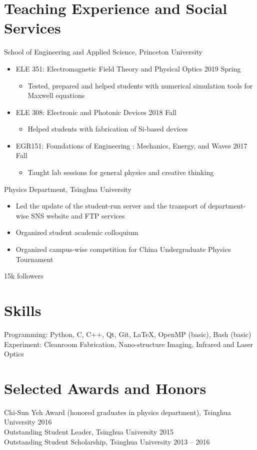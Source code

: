 \documentclass[11pt,letterpaper]{resume}
\begin{document}
\section{Teaching Experience and Social Services}
School of Engineering and Applied Science, Princeton University
\begin{itemize}
    \item ELE 351: Electromagnetic Field Theory and Physical Optics
    \hfill 2019 Spring
    \begin{itemize}
        \item Tested, prepared and helped students with 
        numerical simulation tools for Maxwell equations
    \end{itemize}
    \item ELE 308: Electronic and Photonic Devices
    \hfill 2018 Fall
    \begin{itemize}
        \item Helped students with fabrication of Si-based devices
    \end{itemize}
    \item EGR151: Foundations of Engineering : Mechanics, Energy, and Waves
    \hfill 2017 Fall
    \begin{itemize}
        \item Taught lab sessions for general physics and creative thinking
    \end{itemize}
\end{itemize}\medskip

Physics Department, Tsinghua University
\begin{itemize}
    \item Led the update of the student-run server and 
    the transport of department-wise SNS website and FTP services
    \item Organized student academic colloquium 
    \item Organized campus-wise competition for China Undergraduate Physics 
    Tournament
\end{itemize}\medskip

15k followers

\section{Skills}
Programming: Python, C, C++, Qt, Git, \LaTeX, OpenMP (basic), Bash (basic)\\
Experiment: Cleanroom Fabrication, Nano-structure Imaging, 
Infrared and Laser Optics

\section{Selected Awards and Honors} 
Chi-Sun Yeh Award (honored graduates in physics department), Tsinghua University \hfill 2016 \\
Outstanding Student Leader, Tsinghua University \hfill 2015 \\
Outstanding Student Scholarship, Tsinghua University \hfill 2013 -- 2016\\
\end{document}
